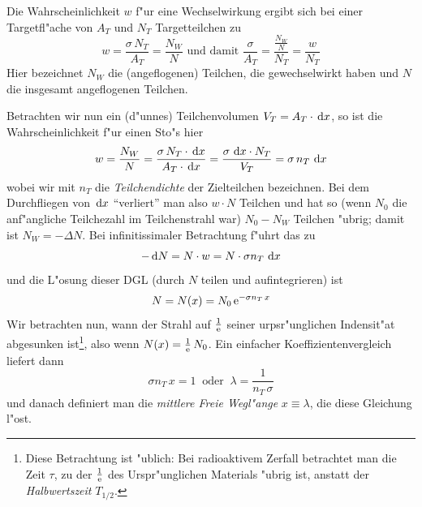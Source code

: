 Die Wahrscheinlichkeit $w$ f"ur eine Wechselwirkung ergibt sich bei
einer Targetfl"ache von $A_T$ und $N_T$ Targetteilchen zu
\begin{equation*}
   w = \frac{\sigma \, N_T}{A_T} = \frac{N_W}{N} \text{ und damit } 
 \frac{\sigma}{A_T} = \frac{\frac{N_W}{N}}{N_T} = \frac{w}{N_T}
\end{equation*}
Hier bezeichnet $N_W$ die (angeflogenen) Teilchen, die gewechselwirkt
haben und $N$ die insgesamt angeflogenen Teilchen. 

Betrachten wir nun ein (d"unnes) Teilchenvolumen $V_T = A_T \cdot \, \mathrm{d}
x$, so ist die Wahrscheinlichkeit f"ur einen Sto"s hier
\begin{equation*}
   w = \frac{N_W}{N} = \frac{\sigma \, N_T \cdot \, \mathrm{d} x}{A_T \cdot \, \mathrm{d} x}
=
\frac{\sigma \, \, \mathrm{d} x \cdot N_T}{V_T} = \sigma \, n_T \, \, \mathrm{d} x
\end{equation*}
wobei wir mit $n_T$ die \emph{Teilchendichte} der Zielteilchen
bezeichnen.  Bei dem Durchfliegen von $\, \mathrm{d} x$ "`verliert"' man also
$w \cdot N$ Teilchen und hat so (wenn $N_0$ die anf"angliche
Teilchezahl im Teilchenstrahl war) $N_0 - N_W$ Teilchen "ubrig; damit
ist $N_W = - \Delta N$. Bei infinitissimaler Betrachtung f"uhrt das zu
\begin{equation*}
   - \, \mathrm{d} N = N \cdot w = N \cdot \sigma n_T \, \, \mathrm{d} x
\end{equation*}
und die L"osung dieser DGL (durch $N$ teilen und aufintegrieren) ist
\begin{equation*}
   N = N(x) = N_0 \operatorname{e}^{- \sigma n_T \, x} 
\end{equation*}
Wir betrachten nun, wann der Strahl auf $\frac{1}{\operatorname{e}}$ seiner
urpsr"unglichen Indensit"at abgesunken ist\footnote{Diese Betrachtung
  ist "ublich: Bei radioaktivem Zerfall betrachtet man die Zeit $\tau$,
zu der $\frac{1}{\operatorname{e}}$ des Urspr"unglichen Materials "ubrig ist, anstatt
der \emph{Halbwertszeit} $T_{1/2}$.}, also wenn $N(x) = \frac{1}{\operatorname{e}}\, N_0$.
Ein einfacher Koeffizientenvergleich liefert dann
\begin{equation*}
   \sigma n_T \, x = 1 ~  \text{ oder }  ~ \lambda = \frac{1}{n_T \, \sigma}
\end{equation*}
und danach definiert man die \emph{mittlere Freie Wegl"ange} $x \equiv \lambda$,
die diese Gleichung l"ost.













